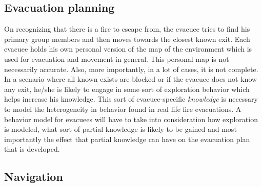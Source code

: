 \subsection{Evacuation planning}
\label{IBEVAC:Knowledge}
	On recognizing that there is a fire to escape from, the evacuee tries to find his primary group members and then moves towards the closest known exit. Each evacuee holds his own personal version of the map of the environment which is used for evacuation and movement in general. This personal map is not necessarily accurate. Also, more importantly, in a lot of cases, it is not complete. In a scenario where all known exists are blocked or if the evacuee does not know any exit, he/she is likely to engage in some sort of exploration behavior which helps increase his knowledge. This sort of evacuee-specific \emph{knowledge} is necessary to model the heterogeneity in behavior found in real life fire evacuations. A behavior model for evacuees will have to take into consideration how exploration is modeled, what sort of partial knowledge is likely to be gained and most importantly the effect that partial knowledge can have on the evacuation plan that is developed.



\subsection{Navigation}
\label{IBEVAC:Navigation}

